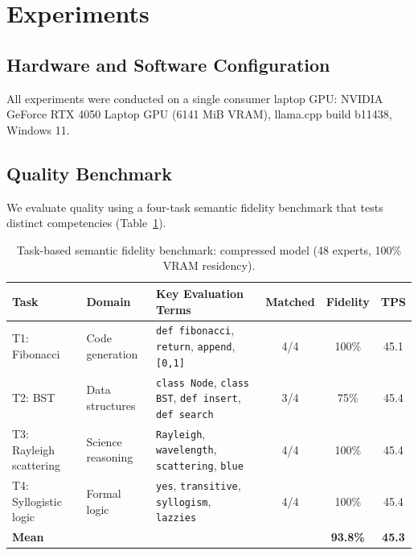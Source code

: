 \documentclass[final]{article}
\begin{document}
\section{Experiments}
\label{sec:experiments}

\subsection{Hardware and Software Configuration}

All experiments were conducted on a single consumer laptop GPU: NVIDIA GeForce RTX 4050 Laptop GPU (6141 MiB VRAM), llama.cpp build b11438, Windows 11.

\subsection{Quality Benchmark}

We evaluate quality using a four-task semantic fidelity benchmark that tests distinct competencies (Table~\ref{tab:benchmark}).

\begin{table}[ht]
\centering
\small
\caption{Task-based semantic fidelity benchmark: compressed model (48 experts, 100\% VRAM residency).}
\label{tab:benchmark}
\begin{tabular}{llp{4.2cm}ccc}
\toprule
\textbf{Task} & \textbf{Domain} & \textbf{Key Evaluation Terms} & \textbf{Matched} & \textbf{Fidelity} & \textbf{TPS} \\
\midrule
T1: Fibonacci & Code generation & \texttt{def fibonacci}, \texttt{return}, \texttt{append}, \texttt{[0,1]} & 4/4 & 100\% & 45.1 \\
T2: BST & Data structures & \texttt{class Node}, \texttt{class BST}, \texttt{def insert}, \texttt{def search} & 3/4 & 75\% & 45.4 \\
T3: Rayleigh scattering & Science reasoning & \texttt{Rayleigh}, \texttt{wavelength}, \texttt{scattering}, \texttt{blue} & 4/4 & 100\% & 45.4 \\
T4: Syllogistic logic & Formal logic & \texttt{yes}, \texttt{transitive}, \texttt{syllogism}, \texttt{lazzies} & 4/4 & 100\% & 45.4 \\
\midrule
\textbf{Mean} & & & & \textbf{93.8\%} & \textbf{45.3} \\
\bottomrule
\end{tabular}
\end{table}
\end{document}
